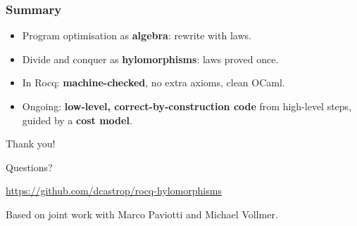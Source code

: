 \begin{frame}
  \frametitle{Summary}
  \begin{itemize}
    \item Program optimisation as \textbf{algebra}: rewrite with laws.
    \item Divide and conquer as \textbf{hylomorphisms}: laws proved once.
    \item In Rocq: \textbf{machine-checked}, no extra axioms, clean OCaml.
    \item Ongoing: \textbf{low-level, correct-by-construction code} from
      high-level steps, guided by a \textbf{cost model}.
  \end{itemize}
\end{frame}

\begin{frame}
  \vfill
  \begin{center}
    \begin{minipage}{.6\textwidth}
      \begin{sticky}[halign = center]
        {\Huge Thank you!\par}
        \bigskip
        {\large Questions?\par}
        \medskip
        \url{https://github.com/dcastrop/rocq-hylomorphisms}
        \medskip

        {\small Based on joint work with Marco Paviotti and Michael
        Vollmer.\par}
      \end{sticky}
    \end{minipage}
  \end{center}
  \vfill
\end{frame}
